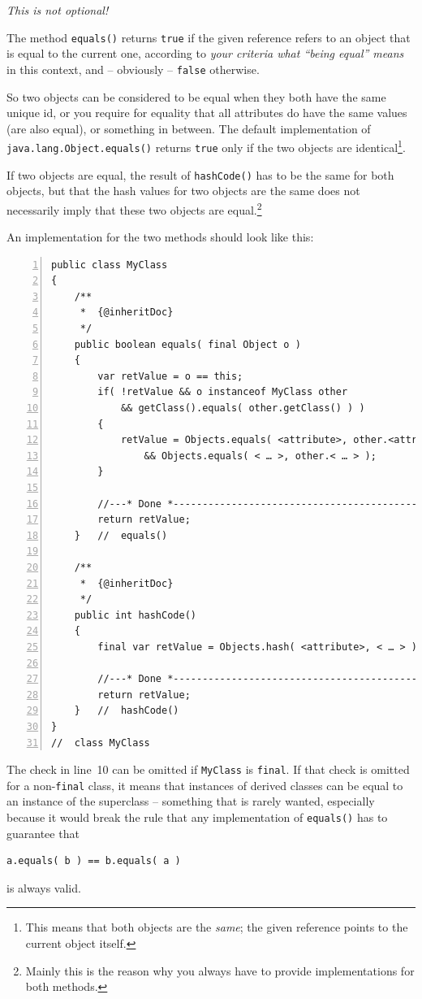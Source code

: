 \documentclass[11pt,a4paper, titlepage, parskip=half, headsepline, footsepline, cleardoublepage=current, headheight=1cm]{scrbook}
\begin{document}
\textit{This is not optional!}

The method \lstinline|equals()| returns \lstinline|true| if the given reference refers to an object that is equal to the current one, according to \textit{your criteria what “being equal” means} in this context, and – obviously – \lstinline|false| otherwise.

So two objects can be considered to be equal when they both have the same unique id, or you require for equality that all attributes do have the same values (are also equal), or something in between. The default implementation of \lstinline|java.lang.Object.equals()| returns \lstinline|true| only if the two objects are identical\footnote{This means that both objects are the \textit{same}; the given reference points to the current object itself.}.

If two objects are equal, the result of \lstinline|hashCode()| has to be the same for both objects, but that the hash values for two objects are the same does not necessarily imply that these two objects are equal.\footnote{Mainly this is the reason why you always have to provide implementations for both methods.}

An implementation for the two methods should look like this:
\begin{lstlisting}[numbers=left,caption={Methods equals() and hashCode()}]
public class MyClass
{
    /**
     *  {@inheritDoc}
     */
    public boolean equals( final Object o )
    {
        var retValue = o == this;
        if( !retValue && o instanceof MyClass other
            && getClass().equals( other.getClass() ) )
        {
            retValue = Objects.equals( <attribute>, other.<attribute> )
                && Objects.equals( < … >, other.< … > );
        }
            
        //---* Done *------------------------------------------------
        return retValue;
    }   //  equals()
    
    /**
     *  {@inheritDoc}
     */
    public int hashCode()
    {
        final var retValue = Objects.hash( <attribute>, < … > );
        
        //---* Done *------------------------------------------------
        return retValue;
    }   //  hashCode()    
}
//  class MyClass
\end{lstlisting}
The check in line~10 can be omitted if \lstinline|MyClass| is \lstinline|final|. If that check is omitted for a non-\lstinline|final| class, it means that instances of derived classes can be equal to an instance of the superclass – something that is rarely wanted, especially because it would break the rule that any implementation of \lstinline|equals()| has to guarantee that
\begin{lstlisting}
a.equals( b ) == b.equals( a )
\end{lstlisting}
is always valid.
\end{document}
